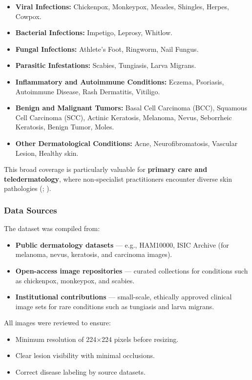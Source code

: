 \documentclass[
  12pt,
  oneside]{article}
\providecommand{\tightlist}{%
  \setlength{\itemsep}{0pt}\setlength{\parskip}{0pt}}
\begin{document}
\begin{itemize}
\tightlist
\item
  \textbf{Viral Infections:} Chickenpox, Monkeypox, Measles, Shingles,
  Herpes, Cowpox.
\item
  \textbf{Bacterial Infections:} Impetigo, Leprosy, Whitlow.
\item
  \textbf{Fungal Infections:} Athlete's Foot, Ringworm, Nail Fungus.
\item
  \textbf{Parasitic Infestations:} Scabies, Tungiasis, Larva Migrans.
\item
  \textbf{Inflammatory and Autoimmune Conditions:} Eczema, Psoriasis,
  Autoimmune Disease, Rash Dermatitis, Vitiligo.
\item
  \textbf{Benign and Malignant Tumors:} Basal Cell Carcinoma (BCC),
  Squamous Cell Carcinoma (SCC), Actinic Keratosis, Melanoma, Nevus,
  Seborrheic Keratosis, Benign Tumor, Moles.
\item
  \textbf{Other Dermatological Conditions:} Acne, Neurofibromatosis,
  Vascular Lesion, Healthy skin.
\end{itemize}

This broad coverage is particularly valuable for \textbf{primary care
and teledermatology}, where non-specialist practitioners encounter
diverse skin pathologies (; ).

\subsubsection{Data Sources}\label{data-sources}

The dataset was compiled from:

\begin{itemize}
\tightlist
\item
  \textbf{Public dermatology datasets} --- e.g., HAM10000, ISIC Archive
  (for melanoma, nevus, keratosis, and carcinoma images).
\item
  \textbf{Open-access image repositories} --- curated collections for
  conditions such as chickenpox, monkeypox, and scabies.
\item
  \textbf{Institutional contributions} --- small-scale, ethically
  approved clinical image sets for rare conditions such as tungiasis and
  larva migrans.
\end{itemize}

All images were reviewed to ensure:

\begin{itemize}
\tightlist
\item
  Minimum resolution of 224×224 pixels before resizing.
\item
  Clear lesion visibility with minimal occlusions.
\item
  Correct disease labeling by source datasets.
\end{itemize}
\end{document}
